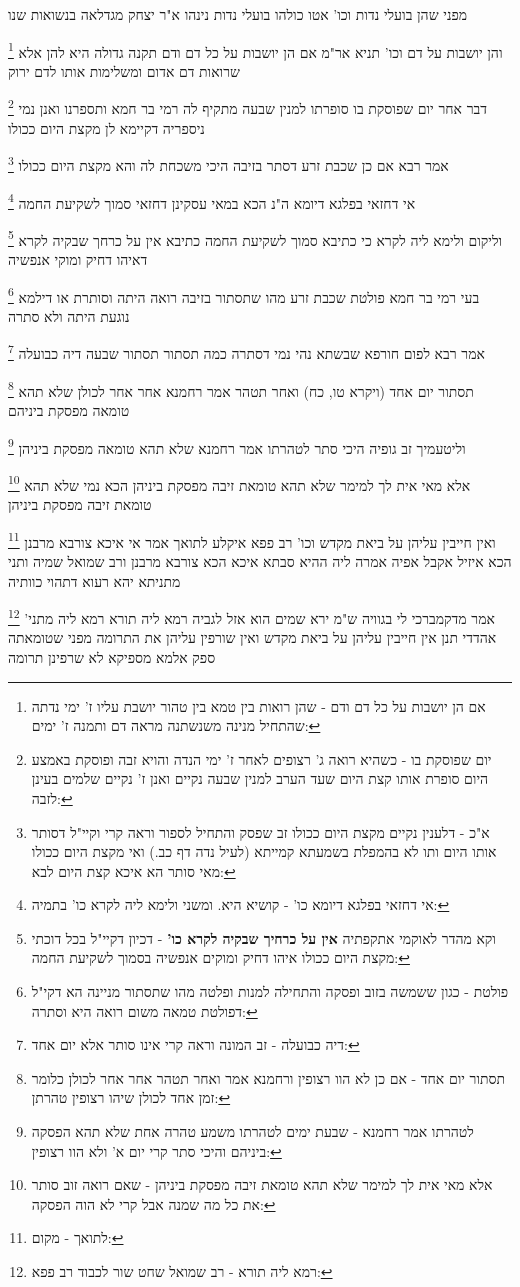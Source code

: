 \documentclass[12pt, openany]{book}
\newcommand{\footnotecomment}[1]{
	\renewcommand\thefootnote{}
	\footnote{#1}}
\newcommand{\commenta}[1]{\footnotecomment{#1}}
\begin{document}
{{מפני שהן בועלי נדות וכו' אטו כולהו בועלי נדות נינהו א"ר יצחק מגדלאה בנשואות שנו
\commenta{אם הן יושבות על כל דם ודם - שהן רואות בין טמא בין טהור יושבת עליו ז' ימי נדתה שהתחיל מנינה משנשתנה מראה דם ותמנה ז' ימים:}
והן יושבות על דם וכו' תניא אר"מ אם הן יושבות על כל דם ודם תקנה גדולה היא להן
אלא שרואות דם אדום ומשלימות אותו לדם ירוק 
\commenta{יום שפוסקת בו - כשהיא רואה ג' רצופים לאחר ז' ימי הנדה והויא זבה ופוסקת באמצע היום סופרת אותו קצת היום שעד הערב למנין שבעה נקיים ואנן ז' נקיים שלמים בעינן לזבה:}
דבר אחר יום שפוסקת בו סופרתו למנין שבעה 
מתקיף לה רמי בר חמא ותספרנו ואנן נמי ניספריה דקיימא לן מקצת היום ככולו 
\commenta{א"כ - דלענין נקיים מקצת היום ככולו זב שפסק והתחיל לספור וראה קרי וקיי"ל דסותר אותו היום ותו לא בהמפלת בשמעתא קמייתא (לעיל נדה דף כב.) ואי מקצת היום ככולו מאי סותר הא איכא קצת היום לבא:}
אמר רבא אם כן שכבת זרע דסתר בזיבה היכי משכחת לה והא מקצת היום ככולו 
\commenta{אי דחזאי בפלגא דיומא כו' - קושיא היא. ומשני ולימא ליה לקרא כו' בתמיה:}
אי דחזאי בפלגא דיומא ה"נ הכא במאי עסקינן דחזאי סמוך לשקיעת החמה 
\commenta{וקא מהדר לאוקמי אתקפתיה \textbf{אין על כרחיך שבקיה לקרא כו'} - דכיון דקיי"ל בכל דוכתי מקצת היום ככולו איהו דחיק ומוקים אנפשיה בסמוך לשקיעת החמה:}
וליקום ולימא ליה לקרא כי כתיבא סמוך לשקיעת החמה כתיבא אין על כרחך שבקיה לקרא דאיהו דחיק ומוקי אנפשיה 
\commenta{פולטת - כגון ששמשה בזוב ופסקה והתחילה למנות ופלטה מהו שתסתור מניינה הא דקי"ל דפולטת טמאה משום רואה היא וסתרה:}
בעי רמי בר חמא פולטת שכבת זרע מהו שתסתור בזיבה רואה היתה וסותרת
או דילמא נוגעת היתה ולא סתרה 
\commenta{דיה כבועלה - זב המונה וראה קרי אינו סותר אלא יום אחד:}
אמר רבא לפום חורפא שבשתא נהי נמי דסתרה כמה תסתור תסתור שבעה דיה כבועלה 
\commenta{תסתור יום אחד - אם כן לא הוו רצופין ורחמנא אמר ואחר תטהר אחר אחר לכולן כלומר זמן אחד לכולן שיהו רצופין טהרתן:}
תסתור יום אחד (ויקרא טו, כח) ואחר תטהר אמר רחמנא אחר אחר לכולן שלא תהא טומאה מפסקת ביניהם 
\commenta{לטהרתו אמר רחמנא - שבעת ימים לטהרתו משמע טהרה אחת שלא תהא הפסקה ביניהם והיכי סתר קרי יום א' ולא הוו רצופין:}
וליטעמיך זב גופיה היכי סתר לטהרתו אמר רחמנא שלא תהא טומאה מפסקת ביניהן 
\commenta{אלא מאי אית לך למימר שלא תהא טומאת זיבה מפסקת ביניהן - שאם רואה זוב סותר את כל מה שמנה אבל קרי לא הוה הפסקה:}
אלא מאי אית לך למימר שלא תהא טומאת זיבה מפסקת ביניהן הכא נמי שלא תהא טומאת זיבה מפסקת ביניהן
\commenta{לתואך - מקום:}
ואין חייבין עליהן על ביאת מקדש וכו' רב פפא איקלע לתואך אמר אי איכא צורבא מרבנן הכא איזיל אקבל אפיה אמרה ליה ההיא סבתא איכא הכא צורבא מרבנן ורב שמואל שמיה ותני מתניתא יהא רעוא דתהוי כוותיה 
\commenta{רמא ליה תורא - רב שמואל שחט שור לכבוד רב פפא:}
אמר מדקמברכי לי בגוויה ש"מ ירא שמים הוא אזל לגביה רמא ליה תורא רמא ליה מתני' אהדדי תנן אין חייבין עליהן על ביאת מקדש ואין שורפין עליהן את התרומה מפני שטומאתה ספק אלמא מספיקא לא שרפינן תרומה
}}
\end{document}
